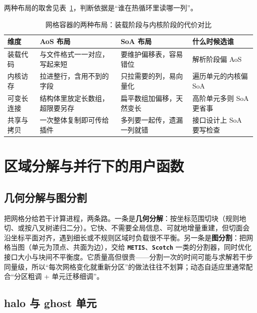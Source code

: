 \documentclass[12pt,a4paper,fontset=fandol]{ctexbook}
\newcommand{\Lib}[1]{\textbf{\texttt{#1}}}
\begin{document}
两种布局的取舍见表~\ref{tab:ch08-layout}，判断依据是``谁在热循环里读哪一列''。

\begin{table}[htbp]
\centering
{\small
\begin{tabular}{%
 >{\raggedright\arraybackslash}p{}
 >{\raggedright\arraybackslash}p{}
 >{\raggedright\arraybackslash}p{}
 >{\raggedright\arraybackslash}p{}}
\toprule
维度 & AoS 布局 & SoA 布局 & 什么时候选谁 \\
\midrule
装载代码 & 与文件格式一一对应，写起来短 & 要维护偏移表，容易错位 & 解析阶段偏 AoS \\
内核访存 & 拉进整行，含用不到的字段 & 只拉需要的列，易向量化 & 遍历单元的内核偏 SoA \\
可变长连接 & 结构体里放定长数组，超限要另存 & 扁平数组加偏移，天然变长 & 高阶单元多则 SoA 更省事 \\
共享与拷贝 & 一次整体复制即可传给插件 & 多列要一起传，遗漏一列就错 & 接口设计上 SoA 要写检查 \\
\bottomrule
\end{tabular}
}
\caption{网格容器的两种布局：装载阶段与内核阶段的代价对比}
\label{tab:ch08-layout}
\end{table}

\section{区域分解与并行下的用户函数}
\label{sec:ch08-decomposition}

\subsection*{几何分解与图分割}

把网格分给若干计算进程，两条路。一条是\textbf{几何分解}：按坐标范围切块（规则地切、或按八叉树递归二分）。它快、不需要全局信息、可就地增量重建，但切面会沿坐标平面对齐，遇到细长或不规则区域时负载很不平衡。另一条是\textbf{图分割}：把网格当图（单元为顶点、共面为边），交给 \Lib{METIS}、\Lib{Scotch} 一类的分割器，同时优化接口大小与块间不平衡度。它质量高但很贵——分割一次的时间可能与求解若干步同量级，所以``每次网格变化就重新分区''的做法往往不划算；动态自适应里通常配合``分区粗调 + 单元迁移细调''。

\subsection*{halo 与 ghost 单元}
\end{document}
